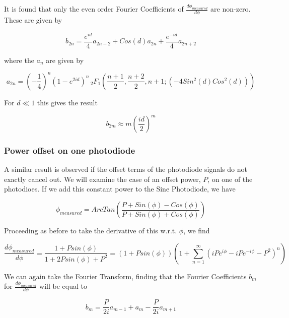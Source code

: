 \documentclass{article}
\begin{document}
It is found that only the even order Fourier Coefficients of $\frac{d\phi_{measured}}{d\phi}$
are non-zero. These are given by

\begin{equation}
b_{2n}=\frac{e^{id}}{4}a_{2n-2}+Cos(d)a_{2n}+\frac{e^{-id}}{4}a_{2n+2}
\end{equation}


where the $a_{n}$ are given by

\begin{equation}
a_{2n}=\left(-\frac{1}{4}\right)^{n}\left(1-e^{2id}\right)^{n}\,_{2}F_{1}\left(\frac{n+1}{2},\frac{n+2}{2},n+1;\left(-4Sin^{2}(d)Cos^{2}(d)\right)\right)
\end{equation}


For $d\ll1$ this gives the result

\begin{equation}
b_{2m}\approx m\left(\frac{id}{2}\right)^{m}
\end{equation}



\subsubsection{Power offset on one photodiode}

A similar result is observed if the offset terms of the photodiode
signals do not exactly cancel out. We will examine the case of an
offset power, $P$, on one of the photodioes. If we add this constant
power to the Sine Photodiode, we have

\begin{equation}
\phi_{measured}=ArcTan\left(\frac{P+Sin\left(\phi\right)-Cos\left(\phi\right)}{P+Sin\left(\phi\right)+Cos\left(\phi\right)}\right)
\end{equation}


Proceeding as before to take the derivative of this w.r.t. $\phi$,
we find

\[
\frac{d\phi_{measured}}{d\phi}=\frac{1+Psin(\phi)}{1+2Psin(\phi)+P^{2}}=(1+Psin(\phi))\left(1+{\displaystyle \sum_{n=1}^{\infty}\left(iPe^{i\phi}-iPe^{-i\phi}-P^{2}\right)^{n}}\right)
\]


We can again take the Fourier Transform, finding that the Fourier
Coefficients $b_{m}$ for $\frac{d\phi_{measured}}{d\phi}$ will be
equal to

\begin{equation}
b_{m}=\frac{P}{2i}a_{m-1}+a_{m}-\frac{P}{2i}a_{m+1}
\end{equation}
\end{document}
